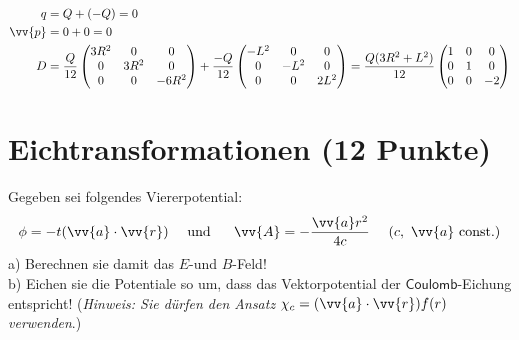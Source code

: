 \documentclass[a4paper,12pt]{article}
\begin{document}
\begin{align*}
q&=Q+(-Q)=0\\
\vv{p}&=0+0=0\\
D&=\frac{Q}{12}\begin{pmatrix}3R^2&0&0\\ 0 & 3R^2 & 0 \\ 0 & 0 & -6R^2\end{pmatrix}+\frac{-Q}{12}\begin{pmatrix}-L^2&0&0\\ 0 & -L^2 & 0 \\ 0 & 0 & 2L^2\end{pmatrix}=\frac{Q(3R^2+L^2)}{12}\begin{pmatrix}1&0&0\\ 0 & 1 & 0 \\ 0 & 0 & -2\end{pmatrix}
\end{align*} 
\section{Eichtransformationen (12 Punkte)}
Gegeben sei folgendes Viererpotential: 
$$\phi=-t(\vv{a}\cdot\vv{r})\ \ \ \ \textrm{und }\ \ \ \ \vv{A}=-\frac{\vv{a}r^2}{4c}\ \ \ \ (c,\ \vv{a}\  \textrm{const.})$$
a) Berechnen sie damit das $E$-und $B$-Feld!\\
b) Eichen sie die Potentiale so um, dass das Vektorpotential der $\mathsf{Coulomb}$-Eichung entspricht! (\textsl{Hinweis: Sie dürfen den Ansatz $\chi_c=(\vv{a}\cdot\vv{r})f(r)$ verwenden}.)
\end{document}
